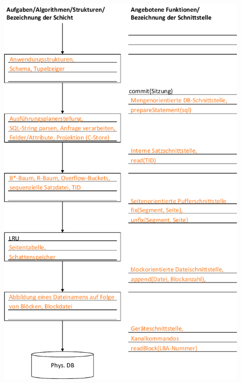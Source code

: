 \begin{normalText}
\begin{center}
\ifnotes
	\includegraphics[width=0.9\textwidth]{Pictures/UeIDB11_Optimierung_Schichtenmodell_ML.pdf}
\else

\end{center}
\end{normalText}
